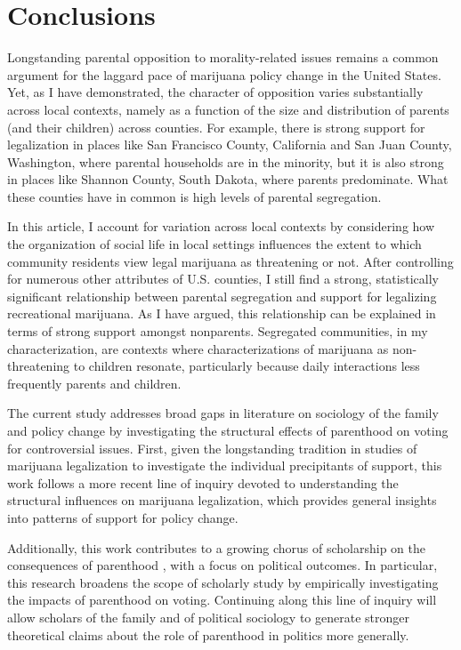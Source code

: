 \vspace{-50pt}

\section{Conclusions}

Longstanding parental opposition to morality-related issues remains a common argument for the laggard pace of marijuana policy change in the United States. 
Yet, as I have demonstrated, the character of opposition varies substantially across local contexts, namely as a function of the size and distribution of parents (and their children) across counties. For example, there is strong support for legalization in places like San Francisco County, California and San Juan County, Washington, where parental households are in the minority, but it is also strong in places like Shannon County, South Dakota, where parents predominate. What these counties have in common is high levels of parental segregation. %

In this article, I account for variation across local contexts by considering how the organization of social life in local settings influences the extent to which community residents view legal marijuana as threatening or not. After controlling for numerous other attributes of U.S. counties, I still find a strong, statistically significant relationship between parental segregation and support for legalizing recreational marijuana. As I have argued, this relationship can be explained in terms of strong support amongst nonparents. Segregated communities, in my characterization, are contexts where characterizations of marijuana as non-threatening to children resonate, particularly because daily interactions less frequently parents and children.

The current study addresses broad gaps in literature on sociology of the family and policy change by investigating the structural effects of parenthood on voting for controversial issues. First, given the longstanding tradition in studies of marijuana legalization to investigate the individual precipitants of support, this work follows a more recent line of inquiry devoted to understanding the structural influences on marijuana legalization, which provides general insights into patterns of support for policy change. 

Additionally, this work contributes to a growing chorus of scholarship on the consequences of parenthood \citep{beisel_1997,owens_2016}, with a focus on political outcomes. In particular, this research broadens the scope of scholarly study by empirically investigating the impacts of parenthood on voting. Continuing along this line of inquiry will allow scholars of the family and of political sociology to generate stronger theoretical claims about the role of parenthood in politics more generally.

